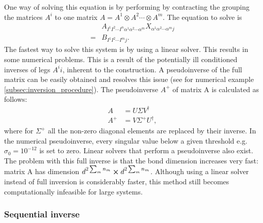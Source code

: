One way of solving this equation is by performing by contracting the grouping the matrices $A^i$ to one matrix $A = A^1 \otimes A^2 \cdots \otimes A^m$. The equation to solve is
\begin{equation}
    \begin{split}
        &A_{ I^1  I^2 \cdots I^n \alpha^1 \alpha^2 \cdots \alpha^m   } X_{ \alpha^1 \alpha^2 \cdots \alpha^m j  } \\
        = &B_{  I^1  I^2 \cdots I^m   j } .
    \end{split}
\end{equation}
The fastest way to solve this system is by using a linear solver. This results in some numerical problems. This is a result of the potentially ill conditioned inverses of legs $A^ii$, inherent to the construction. A pseudoinverse of the full matrix can be easily obtained and resolves this issue (see for numerical example \cref{subsec:inversion_procedure}). The pseudoinverse $A^{+}$ of matrix A is calculated as follows:
\begin{align}
    A     & = U \Sigma V^{\dagger}      \\
    A^{+} & = V \Sigma^{+} U^{\dagger},
\end{align}
where for $\Sigma^{+}$ all the non-zero diagonal elements are replaced by their inverse. In the numerical pseudoinverse, every singular value below a given threshold e.g.\ $\sigma_0 = 10^{-12}$ is set to zero. Linear solvers that perform a pseudoinverse also exist. The problem with this full inverse is that the bond dimension increases very fast: matrix A has dimension $d^ {2 \sum_m n_m } \cross d^ {2 \sum_m n_m } $. Although using a linear solver instead of full inversion is considerably faster, this method still becomes computationally infeasible for large systems.

\subsubsection{Sequential inverse}

